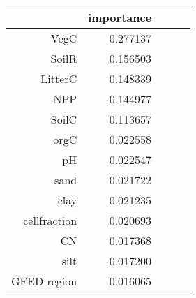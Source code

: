 \begin{tabular}{rrrrr}
\toprule
 & importance \\
\midrule
VegC & 0.277137 \\
SoilR & 0.156503 \\
LitterC & 0.148339 \\
NPP & 0.144977 \\
SoilC & 0.113657 \\
orgC & 0.022558 \\
pH & 0.022547 \\
sand & 0.021722 \\
clay & 0.021235 \\
cellfraction & 0.020693 \\
CN & 0.017368 \\
silt & 0.017200 \\
GFED-region & 0.016065 \\
\bottomrule
\end{tabular}
